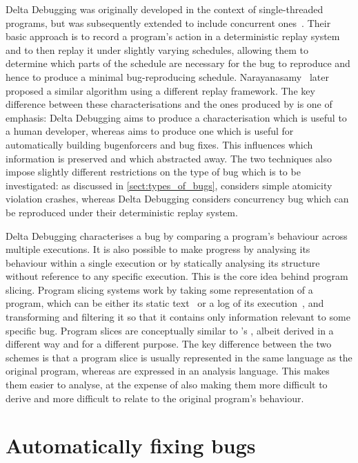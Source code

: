 Delta Debugging was originally developed in the context of
single-threaded programs, but was subsequently extended to include
concurrent ones~\cite{Choi2002}.  Their basic approach is to record a
program's action in a deterministic replay system and to then replay
it under slightly varying schedules, allowing them to determine which
parts of the schedule are necessary for the bug to reproduce and hence
to produce a minimal bug-reproducing schedule.
Narayanasamy~\cite{Narayanasamy2007} later proposed a similar
algorithm using a different replay framework.  The key difference
between these characterisations and the ones produced by {\technique}
is one of emphasis: Delta Debugging aims to produce a characterisation
which is useful to a human developer, whereas {\technique} aims to
produce one which is useful for automatically building
\glspl{bugenforcer} and bug fixes.  This influences which information
is preserved and which abstracted away.  The two techniques also
impose slightly different restrictions on the type of bug which is to
be investigated: as discussed in \autoref{sect:types_of_bugs},
{\technique} considers simple atomicity violation crashes, whereas
Delta Debugging considers concurrency bug which can be reproduced
under their deterministic replay system.

Delta Debugging characterises a bug by comparing a program's behaviour
across multiple executions.  It is also possible to make progress by
analysing its behaviour within a single execution or by statically
analysing its structure without reference to any specific execution.
This is the core idea behind program slicing.  Program slicing systems
work by taking some representation of a program, which can be either
its static text~\cite{Weiser1981} or a log of its
execution~\cite{Agrawal1990a}, and transforming and filtering it so
that it contains only information relevant to some specific bug.
Program slices are conceptually similar to {\technique}'s
{\StateMachines}, albeit derived in a different way and for a
different purpose.  The key difference between the two schemes is that
a program slice is usually represented in the same language as the
original program, whereas {\StateMachines} are expressed in an
analysis language.  This makes them easier to analyse, at the expense
of also making them more difficult to derive and more difficult to
relate to the original program's behaviour.

\section{Automatically fixing bugs}

